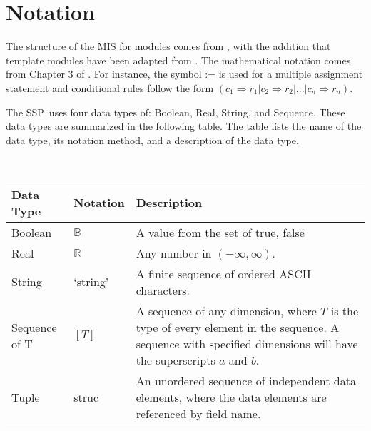 \documentclass[12pt, titlepage]{article}
\newcommand{\progname}{SSP}
\begin{document}

\newpage

\section{Notation}

The structure of the MIS for modules comes from \citet{HoffmanAndStrooper1995},
with the addition that template modules have been adapted from
\cite{GhezziEtAl2003}.  The mathematical notation comes from Chapter 3 of
\citet{HoffmanAndStrooper1995}.  For instance, the symbol := is used for a
multiple assignment statement and conditional rules follow the form $(c_1
\Rightarrow r_1 | c_2 \Rightarrow r_2 | ... | c_n \Rightarrow r_n )$.

The \progname\ uses four data types of: Boolean, Real, String, and
Sequence. These data types are summarized in the following table. The
table lists the name of the data type, its notation method, and a
description of the data type.

~\newline \renewcommand*{\arraystretch}{1.5}
\begin{tabular}{p{} p{} p{}}
  \hline \textbf{Data Type} & \textbf{Notation} & \textbf{Description}
  \\ \hline

  Boolean & $\mathbb{B}$ & A value from the set of {true, false}\\
  
  Real & $\mathbb{R}$ & Any number in $\left( -\infty, \infty
  \right)$.\\

  String & `string' & A finite sequence of ordered ASCII
  characters.\\

  Sequence of T & $[T]$ & A sequence of any dimension, where $T$ is
  the type of every element in the sequence. A sequence with specified
  dimensions will have the superscripts $a$ and $b$.\\ 
  
  Tuple & struc & An unordered sequence of independent data elements, 
  where the data elements are referenced by field name. \\ \hline
\end{tabular}
\end{document}
